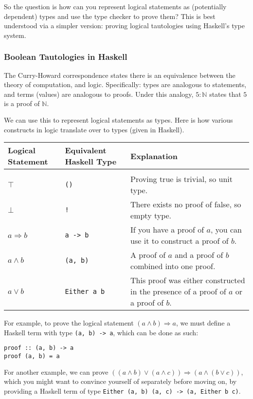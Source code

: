 \documentclass[12pt,twoside]{report}
\begin{document}
So the question is how can you represent logical statements as (potentially dependent) types and use the type checker to prove them? This is best understood via a simpler version: proving logical tautologies using Haskell's type system.

\subsubsection{Boolean Tautologies in Haskell}
The Curry-Howard correspondence states there is an equivalence between the theory of computation, and logic. Specifically: types are analogous to statements, and terms (values) are analogous to proofs. Under this analogy, $5 : \mathbb{N}$ states that $5$ is a proof of $\mathbb{N}$.

We can use this to represent logical statements as types. Here is how various constructs in logic translate over to types (given in Haskell).

\begin{tabularx}{\textwidth}{ X|X|X }
  Logical Statement & Equivalent Haskell Type & Explanation \\
  \hline \\
  $\top$ & \verb|()| & Proving true is trivial, so unit type. \\
  $\bot$ & \verb|!| & There exists no proof of false, so empty type. \\
  $a \Rightarrow b$ & \verb|a -> b| & If you have a proof of $a$, you can use it to construct a proof of $b$. \\
  $a \wedge b$ & \verb|(a, b)| & A proof of $a$ and a proof of $b$ combined into one proof. \\
  $a \vee b$ & \verb|Either a b| & This proof was either constructed in the presence of a proof of $a$ or a proof of $b$.
\end{tabularx}

For example, to prove the logical statement $(a \wedge b) \Rightarrow a$, we must define a Haskell term with type \verb|(a, b) -> a|, which can be done as such:

\begin{lstlisting}
proof :: (a, b) -> a
proof (a, b) = a
\end{lstlisting}

For another example, we can prove $((a \wedge b) \vee (a \wedge c)) \Rightarrow (a \wedge (b \vee c))$, which you might want to convince yourself of separately before moving on, by providing a Haskell term of type \verb|Either (a, b) (a, c) -> (a, Either b c)|.
\end{document}

